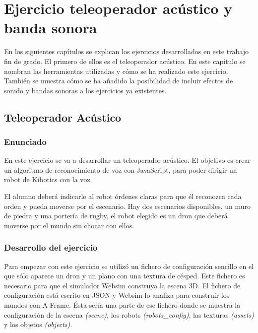 \chapter{Ejercicio teleoperador acústico y banda sonora}\label{audio}
En los siguientes capítulos se explican los ejercicios desarrollados en este trabajo fin de grado. El primero de ellos es el teleoperador acústico. En este capítulo se nombran las herramientas utilizadas y cómo se ha realizado este ejercicio. También se muestra cómo se ha añadido la posibilidad de incluir efectos de sonido y bandas sonoras a los ejercicios ya existentes. 

\section{Teleoperador Acústico}
\subsection{Enunciado}
En este ejercicio se va a desarrollar un teleoperador acústico. El objetivo es crear un algoritmo de reconocimiento de voz con JavaScript, para poder dirigir un robot de Kibotics con la voz. 

El alumno deberá indicarle  al robot órdenes claras para que él reconozca cada orden  y pueda moverse por el escenario. Hay dos escenarios disponibles, un muro de piedra y una portería de rugby, el robot elegido es un dron que deberá moverse por el mundo sin chocar con ellos.

\subsection{Desarrollo del ejercicio}

Para empezar con este ejercicio se utilizó un fichero de configuración sencillo en el que sólo aparece un dron y un plano con una textura de césped. Este fichero es necesario para que el simulador Websim construya la escena 3D. El fichero de configuración está escrito en JSON y Websim lo analiza para construir los mundos con A-Frame. 
Ésta sería una parte de ese fichero donde se muestra la configuración de la escena \textit{(scene)}, los robots \textit {(robots\_config)}, las texturas \textit{(assets)} y los objetos \textit{(objects)}.

